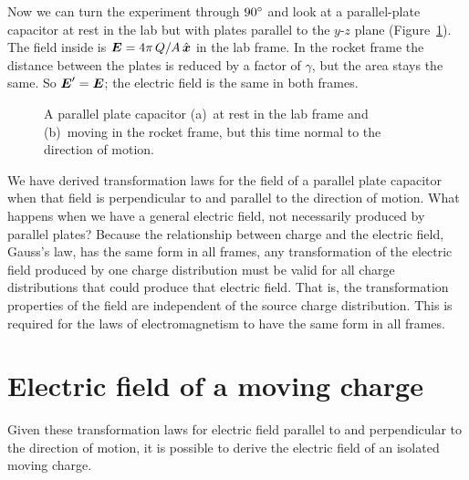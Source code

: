 Now we can turn the experiment through $90\degrees$ and look at a
parallel-plate capacitor at rest in the lab but with plates parallel
to the $y$-$z$ plane (Figure~\ref{fig:capacitor3}).  The field inside
is $\mbox{\boldmath $E$}=4\pi\,Q/A\,\hat{\mbox{\boldmath $x$}}$ in the lab frame.  In the rocket
frame the distance between the plates is reduced by a factor of
$\gamma$, but the area stays the same.  So $\mbox{\boldmath $E$}'=\mbox{\boldmath $E$}$; the
electric field is the same in both frames.
\begin{figure}
\vspace{2in}
\caption[A parallel plate capacitor at $90\degrees$]{A parallel plate
capacitor (a)~at rest in the lab frame and (b)~moving in the rocket
frame, but this time normal to the direction of motion.}
\label{fig:capacitor3}
\end{figure}

We have derived transformation laws for the field of a parallel plate
capacitor when that field is perpendicular to and parallel to the
direction of motion.  What happens when we have a general electric
field, not necessarily produced by parallel plates?  Because the
relationship between charge and the electric field, Gauss's law, has
the same form in all frames, any transformation of the electric field
produced by one charge distribution must be valid for all charge
distributions that could produce that electric field.  That is, the
transformation properties of the field are independent of the source
charge distribution.  This is required for the laws of
electromagnetism to have the same form in all frames.


\section{Electric field of a moving charge}

Given these transformation laws for electric field parallel to and
perpendicular to the direction of motion, it is possible to derive the
electric field of an isolated moving charge.

